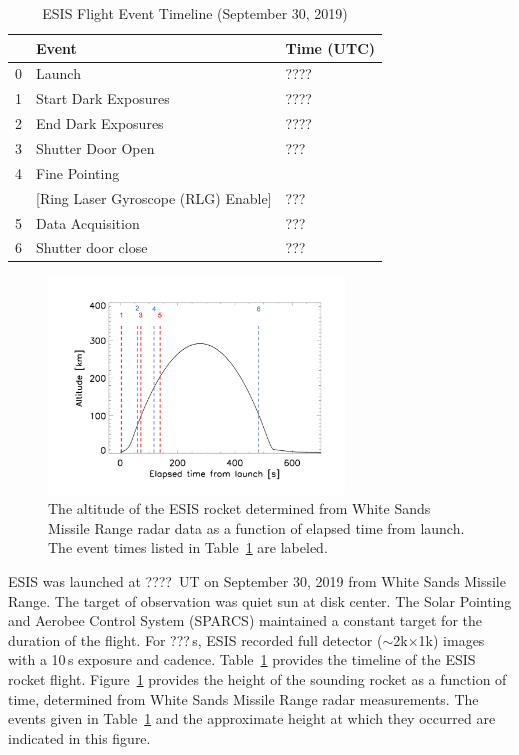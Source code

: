 		\begin{center}
			\begin{table}[ht]
				\caption{ESIS Flight Event Timeline (September 30, 2019)}
				\label{tab:timeline}
				\begin{tabular}{lll}\hline
					{\bf} & {\bf Event} & {\bf Time (UTC)}\\ \hline
					0 & Launch        &    ???? \\
					1 & Start Dark Exposures  &  ????\\
					2 & End Dark  Exposures  &  ????\\
					3 & Shutter Door Open     &   ??? \\
					4 & Fine Pointing    &    \\
					& [Ring Laser Gyroscope (RLG) Enable] & ???\\
					5 & Data Acquisition     &     ???\\
					6 & Shutter door close    &   ??? \\ \hline
				\end{tabular}
			\end{table}
		\end{center}
	
		\begin{figure}[ht]
			\begin{center}
				\includegraphics[width=0.7\textwidth]{figures/altevents.png}
				\caption{The altitude of the ESIS rocket determined from White Sands Missile Range radar data as a function of elapsed time from launch.  The event times listed in Table~\ref{tab:timeline} are labeled.}
				\label{fig:timeline}
			\end{center}
		\end{figure}

		ESIS was launched at ????~UT on September 30, 2019 from White Sands Missile Range.  The target of observation was quiet sun at disk center.  The Solar Pointing and Aerobee Control System (SPARCS) maintained a constant target for the duration of the flight.  For ???\,s, ESIS recorded full detector ($\sim$2k$\times$1k) images with a 10\,s exposure and cadence. %
		Table~\ref{tab:timeline} provides the timeline of the ESIS rocket flight. Figure~\ref{fig:timeline} provides the height of the sounding rocket as a function of time, determined from White Sands Missile Range radar measurements.  The events given in Table~\ref{tab:timeline} and the approximate height at which they occurred are indicated in this figure.


